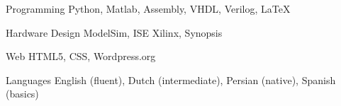 

\begin{cvskills}

  \cvskill
    {Programming} %
    {Python, Matlab, Assembly, VHDL, Verilog, LaTeX} %

  \cvskill
    {Hardware Design} %
    {ModelSim, ISE Xilinx, Synopsis} %

  \cvskill
    {Web} %
    {HTML5, CSS, Wordpress.org} %

  \cvskill
    {Languages} %
    {English (fluent), Dutch (intermediate), Persian (native), Spanish (basics)} %

\end{cvskills}
